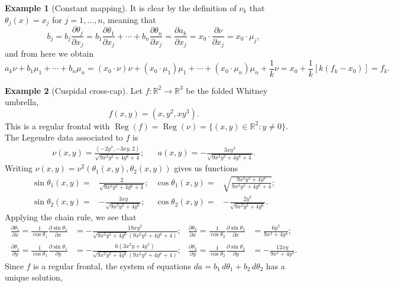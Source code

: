 \documentclass{amsart}
\theoremstyle{definition}
\theoremstyle{definition}
\newtheorem{example}{Example}
\theoremstyle{definition}
\newcommand{\mb}{\mathbb}
\DeclareMathOperator{\Reg}{Reg}
\begin{document}
{\begin{example}[Constant mapping]
	It is clear by the definition of $\nu_{k}$ that 
	$\theta_j(x)=x_j$ for $j=1,\dots,n$, meaning that
		\[b_j=b_j\frac{\partial \theta_j}{\partial x_j}=b_1 \frac{\partial \theta_1}{\partial x_j}+\cdots+b_n \frac{\partial \theta_n}{\partial x_j}=\frac{\partial a_k}{\partial x_j}=x_0\cdot \frac{\partial \nu}{\partial x_j}=x_0\cdot \mu_j,\]
	and from here we obtain
		\[a_k\nu+b_1\mu_1+\cdots+b_n\mu_n=(x_0\cdot \nu)\nu+(x_0\cdot \mu_1) \mu_1+\cdots+(x_0\cdot \mu_n) \mu_n+\frac{1}{k}\nu=x_0+\frac{1}{k}[k(f_k-x_0)]=f_k.\]
\end{example}


\begin{example}[Cuspidal cross-cap]
Let $f\colon \mb{R}^2 \to \mb{R}^3$ be the folded Whitney umbrella,
	\[f(x,y)=(x,y^2,xy^3).\]
This is a regular frontal with $\Reg(f)=\Reg(\nu)=\{(x,y)\in \mb{R}^2: y \neq 0\}$.
The Legendre data associated to $f$ is
\begin{align*}
	\nu(x,y)=\frac{(-2 y^3, -3xy, 2)}{\sqrt{9 x^2 y^2+4 y^6+4}}; && a(x,y)=-\frac{3 x y^3}{\sqrt{9 x^2 y^2+4 y^6+4}}.
\end{align*}
Writing $\nu(x,y)=\nu^2(\theta_1(x,y),\theta_2(x,y))$ gives us functions
\begin{align*}
	\sin \theta_1(x,y)=&\frac{2}{\sqrt{9 x^2 y^2+4 y^6+4}}; 	&\cos \theta_1(x,y)=&\sqrt{\frac{9 x^2 y^2+4 y^6}{9 x^2 y^2+4 y^6+4}};\\
	\sin \theta_2(x,y)=&-\frac{3 x y}{\sqrt{9 x^2 y^2+4 y^6}}; 	&\cos \theta_2(x,y)=&-\frac{2 y^3}{\sqrt{9 x^2 y^2+4 y^6}}.
\end{align*}
Applying the chain rule, we see that
\begin{align*}
	\frac{\partial \theta_1}{\partial x}=\frac{1}{\cos \theta_1}\frac{\partial \sin \theta_1}{\partial x}&=-\frac{18 x y^2}{\sqrt{9 x^2 y^2+4 y^6} \left(9 x^2 y^2+4 y^6+4\right)};
	&
	\frac{\partial \theta_2}{\partial x}=\frac{1}{\cos \theta_2}\frac{\partial \sin \theta_2}{\partial x}&=\frac{6 y^2}{9 x^2+4 y^4};
	\\
	\frac{\partial \theta_1}{\partial y}=\frac{1}{\cos \theta_1}\frac{\partial \sin \theta_1}{\partial y}&=-\frac{6 \left(3 x^2 y+4 y^5\right)}{\sqrt{9 x^2 y^2+4 y^6} \left(9 x^2 y^2+4 y^6+4\right)};&
	\frac{\partial \theta_2}{\partial y}=\frac{1}{\cos \theta_2}\frac{\partial \sin \theta_2}{\partial y}&=-\frac{12 x y}{9 x^2+4 y^4}.
\end{align*}
Since $f$ is a regular frontal, the system of equations $da=b_1\,d\theta_1+b_2\,d\theta_2$ has a unique solution,
\begin{align*}

\end{align*}
\end{example}}
\end{document}
